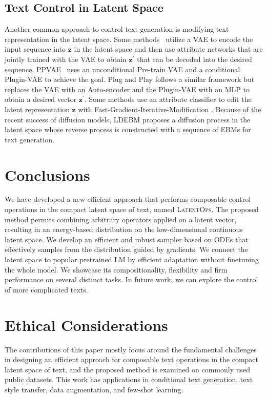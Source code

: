 \documentclass[11pt]{article}
\begin{document}
\subsection{Text Control in Latent Space}
Another common approach to control text generation is modifying text representation in the latent space. Some methods~\cite{DBLP:conf/icml/MuellerGJ17, DBLP:conf/aaai/LiuFZPL20} utilize a VAE to encode the input sequence into $\bm z$ in the latent space and then use attribute networks that are jointly trained with the VAE to obtain $\bm z^\prime$ that can be decoded into the desired sequence. 
PPVAE~\cite{DBLP:conf/acl/DuanXPHL20} uses an unconditional Pre-train VAE and a conditional Plugin-VAE to achieve the goal.
Plug and Play \cite{mai-etal-2020-plug} follows a similar framework but replaces the VAE with an Auto-encoder and the Plugin-VAE with an MLP to obtain a desired vector $\bm z^\prime$. Some methods use an attribute classifier to edit the latent representation $\bm{z}$ with Fast-Gradient-Iterative-Modification \cite{DBLP:conf/nips/WangH019}. Because of the recent success of diffusion models, LDEBM \cite{yulatent} proposes a diffusion process in the latent space whose reverse process is constructed with a sequence of EBMs for text generation. 













%
 \section{Conclusions}
We have developed a new efficient approach that performs composable control operations in the compact latent space of text, named \textsc{LatentOps}. 
The proposed method permits combining arbitrary operators applied on a latent vector, resulting in an energy-based distribution on the low-dimensional continuous latent space.
We develop an efficient and robust sampler based on ODEs that effectively samples from the distribution guided by gradients.
We connect the latent space to popular pretrained LM by efficient adaptation without finetuning the whole model.
We showcase its compositionality, flexibility and firm performance on several distinct tasks.
In future work, we can explore the control of more complicated texts.
 \section*{Ethical Considerations}
The contributions of this paper mostly focus around the fundamental challenges in designing an efficient approach for composable text operations in the compact latent space of text, and the proposed method is examined on commonly used public datasets. This work has applications in conditional text generation, text style transfer, data augmentation, and few-shot learning.
\end{document}
